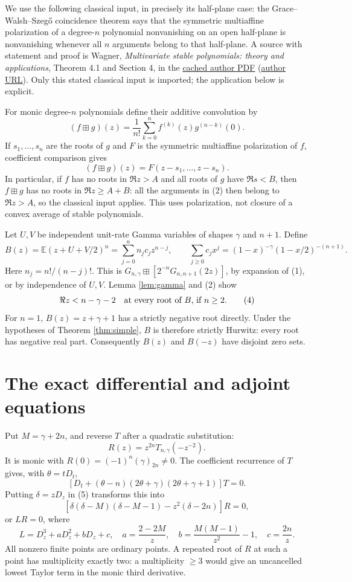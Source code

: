 \documentclass[11pt]{article}
\begin{document}
We use the following classical input, in precisely its half-plane case:
the Grace--Walsh--Szeg\H{o} coincidence theorem says that the symmetric
multiaffine polarization of a degree-$n$ polynomial nonvanishing on an
open half-plane is nonvanishing whenever all $n$ arguments belong to
that half-plane. A source with statement and proof is Wagner,
\emph{Multivariate stable polynomials: theory and applications},
Theorem 4.1 and Section 4, in the
\href{sources/wagner-multivariate-stable-polynomials-2011.pdf}{cached author PDF}
(\href{https://www.math.uwaterloo.ca/~dgwagner/ceb_wagner.pdf}{author URL}).
Only this stated classical input is imported; the application below is explicit.

For monic degree-$n$ polynomials define their additive convolution by
\[
 (f\boxplus g)(z)=\frac1{n!}\sum_{k=0}^n f^{(k)}(z)g^{(n-k)}(0).
                                                               \tag{1}
\]
If $s_1,\ldots,s_n$ are the roots of $g$ and $F$ is the symmetric
multiaffine polarization of $f$, coefficient comparison gives
\[
 (f\boxplus g)(z)=F(z-s_1,\ldots,z-s_n).                         \tag{2}
\]
In particular, if $f$ has no roots in $\Re z>A$ and all roots of $g$
have $\Re s<B$, then $f\boxplus g$ has no roots in $\Re z\ge A+B$:
all the arguments in (2) then belong to $\Re z>A$, so the classical
input applies. This uses polarization, not closure of a convex average
of stable polynomials.

Let $U,V$ be independent unit-rate Gamma variables of shapes
$\gamma$ and $n+1$. Define
\[
 B(z)=\mathbb E(z+U+V/2)^n
     =\sum_{j=0}^n n_{\underline j}c_j z^{n-j},\qquad
 \sum_{j\ge0}c_jx^j=(1-x)^{-\gamma}(1-x/2)^{-(n+1)}.             \tag{3}
\]
Here $n_{\underline j}=n!/(n-j)!$. This is
$G_{n,\gamma}\boxplus [2^{-n}G_{n,n+1}(2z)]$, by expansion of
(1), or by independence of $U,V$. Lemma \ref{lem:gamma} and (2) show
\[
 \Re z<n-\gamma-2\quad\hbox{at every root of $B$, if $n\ge2$}.   \tag{4}
\]
For $n=1$, $B(z)=z+\gamma+1$ has a strictly negative root directly.
Under the hypotheses of Theorem \ref{thm:simple}, $B$ is therefore
strictly Hurwitz: every root has negative real part. Consequently
$B(z)$ and $B(-z)$ have disjoint zero sets.

\section{The exact differential and adjoint equations}
Put $M=\gamma+2n$, and reverse $T$ after a quadratic substitution:
\[
 R(z)=z^{2n}T_{n,\gamma}(-z^{-2}).                              \tag{5}
\]
It is monic with $R(0)=(-1)^n(\gamma)_{2n}\ne0$.
The coefficient recurrence of $T$ gives, with $\theta=tD_t$,
\[
 [D_t+(\theta-n)(2\theta+\gamma)(2\theta+\gamma+1)]T=0.
\]
Putting $\delta=zD_z$ in (5) transforms this into
\[
 [\delta(\delta-M)(\delta-M-1)-z^2(\delta-2n)]R=0,
\]
or $LR=0$, where
\[
 L=D_z^3+aD_z^2+bD_z+c,\quad
 a=\frac{2-2M}{z},\quad b=\frac{M(M-1)}{z^2}-1,\quad c=\frac{2n}{z}.
                                                               \tag{6}
\]
All nonzero finite points are ordinary points. A repeated root of $R$
at such a point has multiplicity exactly two: a multiplicity $\ge3$
would give an uncancelled lowest Taylor term in the monic third derivative.
\end{document}
